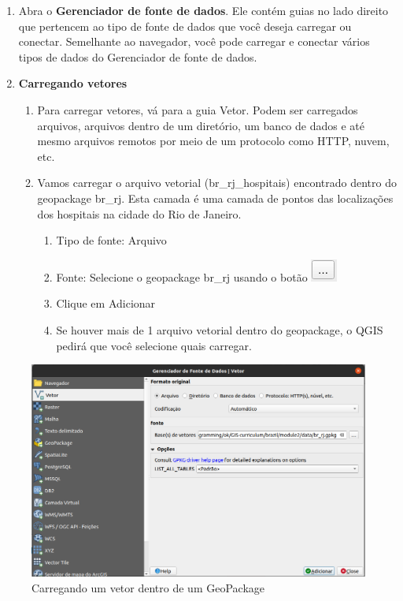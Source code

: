 \documentclass[
  portuguese,
]{krantz}
\providecommand{\tightlist}{%
  \setlength{\itemsep}{0pt}\setlength{\parskip}{0pt}}
\begin{document}
\begin{enumerate}
\def\labelenumi{\arabic{enumi}.}
\item
  Abra o \textbf{Gerenciador de fonte de dados}. Ele contém guias no lado direito que pertencem ao tipo de fonte de dados que você deseja carregar ou conectar. Semelhante ao navegador, você pode carregar e conectar vários tipos de dados do Gerenciador de fonte de dados.
\item
  \textbf{Carregando vetores}

  \begin{enumerate}
  \def\labelenumii{\arabic{enumii}.}
  \item
    Para carregar vetores, vá para a guia Vetor. Podem ser carregados arquivos, arquivos dentro de um diretório, um banco de dados e até mesmo arquivos remotos por meio de um protocolo como HTTP, nuvem, etc.
  \item
    Vamos carregar o arquivo vetorial (br\_rj\_hospitais) encontrado dentro do geopackage br\_rj. Esta camada é uma camada de pontos das localizações dos hospitais na cidade do Rio de Janeiro.

    \begin{enumerate}
    \def\labelenumiii{\arabic{enumiii}.}
    \tightlist
    \item
      Tipo de fonte: Arquivo
    \item
      Fonte: Selecione o geopackage br\_rj usando o botão \includegraphics{media/modulo2/data-source-manager-search.png}
    \item
      Clique em Adicionar
    \item
      Se houver mais de 1 arquivo vetorial dentro do geopackage, o QGIS pedirá que você selecione quais carregar.
    \end{enumerate}
  \end{enumerate}
\end{enumerate}

\begin{figure}
\centering
\includegraphics{media/modulo2/data-source-manager-vector.png}
\caption{Carregando um vetor dentro de um GeoPackage}
\end{figure}
\end{document}
